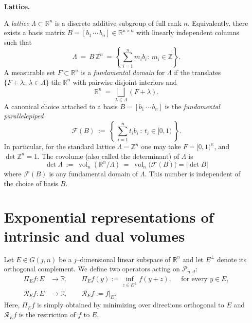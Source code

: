 \documentclass[11pt]{article}
\theoremstyle{definition}
\numberwithin{equation}{section}
\newcommand{\R}{\mathbb{R}}
\newcommand{\Z}{\mathbb{Z}}
\newcommand{\cP}{\mathcal{P}}        %
\DeclareMathOperator{\vol}{vol}
\begin{document}
\medskip

\textbf{Lattice.}

\medskip

A \emph{lattice} $\Lambda\subset \R^n$ is a discrete additive subgroup of full rank $n$.
Equivalently, there exists a basis matrix $B=[b_1\,\cdots\,b_n]\in\R^{n\times n}$ with linearly independent columns such that
\[
  \Lambda\ =\ B\,\Z^n\ =\ \left\{ \sum_{i=1}^n m_i b_i:\ m_i\in\Z\right\}.
\]
A measurable set $F\subset\R^n$ is a \emph{fundamental domain} for $\Lambda$ if the translates $\{F+\lambda:\ \lambda\in\Lambda\}$ tile $\R^n$ with pairwise disjoint interiors and
\[
  \R^n\ =\ \bigsqcup_{\lambda\in\Lambda} (F+\lambda).
\]
A canonical choice attached to a basis $B=[b_1\,\cdots\,b_n]$ is the \emph{fundamental parallelepiped}
\[
  \mathcal F(B)\ :=\ \left\{\ \sum_{i=1}^n t_i b_i\ :\ t_i\in[0,1)\ \right\}.
\]
In particular, for the standard lattice $\Lambda=\Z^n$ one may take $F=[0,1)^n$, and $\det\Z^n=1$. 
The covolume (also called the determinant) of $\Lambda$ is
\[
  \det\Lambda\ :=\ \vol_n(\R^n/\Lambda)\ =\ \vol_n\big(\mathcal F(B)\big) = |\det B|
\]
where $\mathcal F(B)$ is any fundamental domain of $\Lambda$. 
This number is independent of the choice of basis $B$.
\section{Exponential representations of intrinsic and dual volumes}

Let $E \in G(j,n)$ be a $j$--dimensional linear subspace of $\R^n$ and let $E^\perp$ denote its orthogonal complement.  
We define two operators acting on $\cP_{n,d}$:
\begin{align*} \label{eq:PiE}
\Pi_E f : E &\longrightarrow \R, 
\qquad \Pi_E f(y) := \inf_{z \in E^\perp} f(y+z), \quad \text{ for every }y \in E,
\\
\mathscr{R}_E f : E &\longrightarrow \R, 
\qquad \mathscr{R}_E f := f|_E .
\end{align*}
Here, $\Pi_E f$ is simply obtained by minimizing over directions orthogonal to $E$  
and $\mathscr{R}_E f$ is the restriction of $f$ to $E$.
\end{document}
